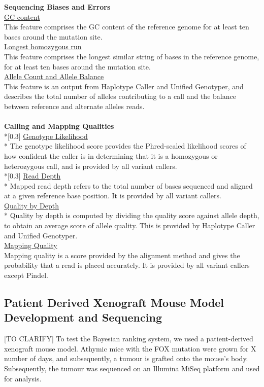 \documentclass{article}
\begin{document}
\textbf{Sequencing Biases and Errors} \\[0.3\baselineskip]
\underline{GC content}\\
This feature comprises the GC content of the reference genome for at least ten bases around the mutation site.\\[0.3\baselineskip]
\underline{Longest homozygous run}\\
This feature comprises the longest similar string of bases in the reference genome, for at least ten bases around the mutation site.\\[0.3\baselineskip]
\underline{Allele Count and Allele Balance}\\
This feature is an output from Haplotype Caller and Unified Genotyper, and describes the total number of alleles contributing to a call and the balance between reference and alternate alleles reads.\\\\
\textbf{Calling and Mapping Qualities} \\*[0.3\baselineskip]
\underline{Genotype Likelihood}\\*
The genotype likelihood score provides the Phred-scaled likelihood scores of how confident the caller is in determining that it is a homozygous or heterozygous call, and is provided by all variant callers.\\*[0.3\baselineskip]
\underline{Read Depth}\\*
Mapped read depth refers to the total number of bases sequenced and aligned at a given reference base position. It is provided by all variant callers.\\[0.3\baselineskip]
\underline{Quality by Depth}\\*
Quality by depth is computed by dividing the quality score against allele depth, to obtain an average score of allele quality. This is provided by Haplotype Caller and Unified Genotyper.\\[0.3\baselineskip]
\underline{Mapping Quality}\\
Mapping quality is a score provided by the alignment method and gives the probability that a read is placed accurately. It is provided by all variant callers except Pindel.\\


\subsection{Patient Derived Xenograft Mouse Model Development and Sequencing}
[TO CLARIFY] To test the Bayesian ranking system, we used a patient-derived xenograft mouse model. Athymic mice with the FOX mutation were grown for X number of days, and subsequently, a tumour is grafted onto the mouse's body. Subsequently, the tumour was sequenced on an Illumina MiSeq platform and used for analysis. 
\end{document}
